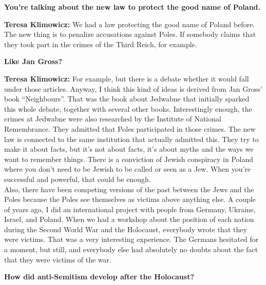 \textbf{You're talking about the new law to protect the good name of Poland.} 

\textbf{Teresa Klimowicz:} We had a law protecting the good name of Poland before. The new thing is to penalize accusations against Poles. If somebody claims that they took part in the crimes of the Third Reich, for example. 

\textbf{Like Jan Gross?} 

\textbf{Teresa Klimowicz:} For example, but there is a debate whether it would fall under those articles. Anyway, I think this kind of ideas is derived from Jan Gross’ book ``Neighbours''. That was the book about Jedwabne that initially sparked this whole debate, together with several other books. Interestingly enough, the crimes at Jedwabne were also researched by the Institute of National Remembrance. They admitted that Poles participated in those crimes. The new law is connected to the same institution that actually admitted this. They try to make it about facts, but it's not about facts, it's about myths and the ways we want to remember things. There is a conviction of Jewish conspiracy in Poland where you don't need to be Jewish to be called or seen as a Jew. When you’re successful and powerful, that could be enough.\\ 
Also, there have been competing versions of the past between the Jews and the Poles because the Poles see themselves as victims above anything else. A couple of years ago, I did an international project with people from Germany, Ukraine, Israel, and Poland. When we had a workshop about the position of each nation during the Second World War and the Holocaust, everybody wrote that they were victims. That was a very interesting experience. The Germans hesitated for a moment, but still, and everybody else had absolutely no doubts about the fact that they were victims of the war.  



\textbf{How did anti-Semitism develop after the Holocaust?}  

